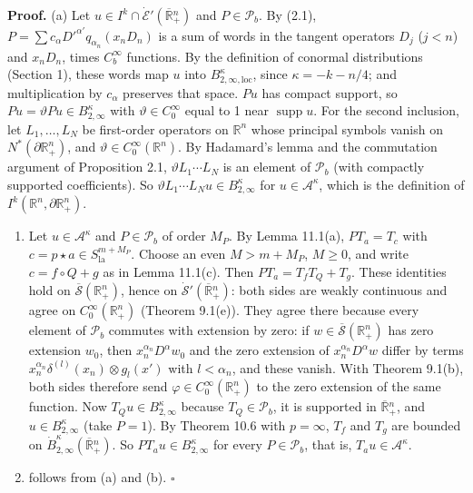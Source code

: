 \documentclass[
  11pt,
]{article}
\begin{document}
\textbf{Proof.} (a) Let
\(u\in I^k\cap\dot{\mathcal E}'(\overline{\mathbb R}{}^n_+)\) and
\(P\in\mathcal P_b\). By (2.1),
\(P=\sum c_\alpha D'^{\alpha'}q_{\alpha_n}(x_nD_n)\) is a sum of words
in the tangent operators \(D_j\) (\(j<n\)) and \(x_nD_n\), times
\(C^\infty_b\) functions. By the definition of conormal distributions
(Section 1), these words map \(u\) into
\(B^{\kappa}_{2,\infty,\mathrm{loc}}\), since \(\kappa=-k-n/4\); and
multiplication by \(c_\alpha\) preserves that space. \(Pu\) has compact
support, so \(Pu=\vartheta Pu\in B^\kappa_{2,\infty}\) with
\(\vartheta\in C_0^\infty\) equal to 1 near \(\operatorname{supp}u\).
For the second inclusion, let \(L_1,\ldots,L_N\) be first-order
operators on \(\mathbb R^n\) whose principal symbols vanish on
\(N^*(\partial\mathbb R^n_+)\), and
\(\vartheta\in C_0^\infty(\mathbb R^n)\). By Hadamard's lemma and the
commutation argument of Proposition 2.1, \(\vartheta L_1\cdots L_N\) is
an element of \(\mathcal P_b\) (with compactly supported coefficients).
So \(\vartheta L_1\cdots L_Nu\in B^\kappa_{2,\infty}\) for
\(u\in\mathcal A^\kappa\), which is the definition of
\(I^k(\mathbb R^n,\partial\mathbb R^n_+)\).

\begin{enumerate}
\def\labelenumi{(\alph{enumi})}
\setcounter{enumi}{1}
\item
  Let \(u\in\mathcal A^\kappa\) and \(P\in\mathcal P_b\) of order
  \(M_P\). By Lemma 11.1(a), \(PT_a=T_c\) with
  \(c=p\star a\in S^{m+M_P}_{\mathrm{la}}\). Choose an even \(M>m+M_P\),
  \(M\geq0\), and write \(c=f\circ Q+g\) as in Lemma 11.1(c). Then
  \(PT_a=T_fT_Q+T_g\). These identities hold on
  \(\overline{\mathcal S}(\mathbb R^n_+)\), hence on
  \(\dot{\mathcal S}'(\overline{\mathbb R}{}^n_+)\): both sides are
  weakly continuous and agree on \(C_0^\infty(\mathbb R^n_+)\) (Theorem
  9.1(e)). They agree there because every element of \(\mathcal P_b\)
  commutes with extension by zero: if
  \(w\in\overline{\mathcal S}(\mathbb R^n_+)\) has zero extension
  \(w_0\), then \(x_n^{\alpha_n}D^\alpha w_0\) and the zero extension of
  \(x_n^{\alpha_n}D^\alpha w\) differ by terms
  \(x_n^{\alpha_n}\delta^{(l)}(x_n)\otimes g_l(x')\) with
  \(l<\alpha_n\), and these vanish. With Theorem 9.1(b), both sides
  therefore send \(\varphi\in C_0^\infty(\mathbb R^n_+)\) to the zero
  extension of the same function. Now \(T_Qu\in B^\kappa_{2,\infty}\)
  because \(T_Q\in\mathcal P_b\), it is supported in
  \(\overline{\mathbb R}{}^n_+\), and \(u\in B^\kappa_{2,\infty}\) (take
  \(P=1\)). By Theorem 10.6 with \(p=\infty\), \(T_f\) and \(T_g\) are
  bounded on \(\dot B^\kappa_{2,\infty}(\overline{\mathbb R}{}^n_+)\).
  So \(PT_au\in B^\kappa_{2,\infty}\) for every \(P\in\mathcal P_b\),
  that is, \(T_au\in\mathcal A^\kappa\).
\item
  follows from (a) and (b). \(\square\)
\end{enumerate}
\end{document}
